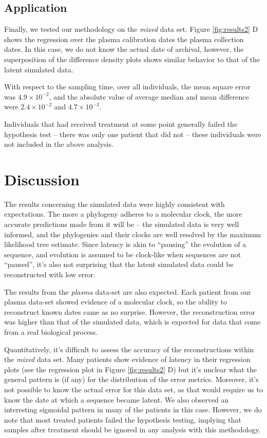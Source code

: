 \documentclass[12pt]{article}
\begin{document}
\subsection * {Application} \label{sec:mixed_data}

Finally, we tested our methodology on the {\em mixed} data set.
Figure \ref{fig:results2} D shows the regression over the plasma calibration dates the plasma collection dates. 
In this case, we do not know the actual date of archival, however, the superposition of the difference density plots shows similar behavior to that of the latent simulated data.

With respect to the sampling time, over all individuals, the mean square error was $4.9\times 10^{-2}$, and the absolute value of average median and mean difference were $2.4\times 10^{-2}$ and $4.7\times 10^{-3}$.

Individuals that had received treatment at some point generally failed the hypothesis test -- there was only one patient that did not -- these individuals were not included in the above analysis. 


\section * {Discussion} \label{sec:discuss}
The results concerning the simulated data were highly consistent with expectations. 
The more a phylogeny adheres to a molecular clock, the more accurate predictions made from it will be -- the simulated data is very well informed, and the phylogenies and their clocks are well resolved by the maximum likelihood tree estimate. 
Since latency is akin to ``pausing'' the evolution of a sequence, and evolution is assumed to be clock-like when sequences are not ``paused'', it's also not surprising that the latent simulated data could be reconstructed with low error. 

The results from the {\em plasma} data-set are also expected. 
Each patient from our plasma data-set showed evidence of a molecular clock, so the ability to reconstruct known dates came as no surprise. 
However, the reconstruction error was higher than that of the simulated data, which is expected for data that come from a real biological process.

Quantitatively, it's difficult to assess the accuracy of the reconstructions within the {\em mixed} data set. 
Many patients show evidence of latency in their regression plots (see the regression plot in Figure \ref{fig:results2} D) but it's unclear what the general pattern is (if any) for the distribution of the error metrics. 
Moreover, it's not possible to know the actual error for this data set, as that would require us to know the date at which a sequence became latent. 
We also observed an interesting sigmoidal pattern in many of the patients in this case.
However, we do note that most treated patients failed the hypothesis testing, implying that samples after treatment should be ignored in any analysis with this methodology.
\end{document}
